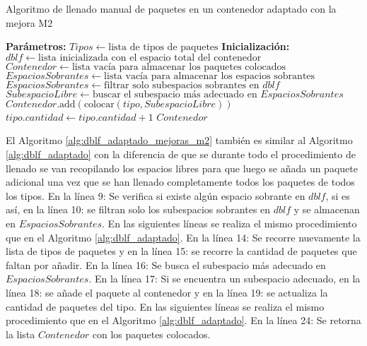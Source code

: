 \begin{algorithm}[H]
    \caption{Algoritmo de llenado manual de paquetes en un contenedor adaptado con la mejora M2}
    \label{alg:dblf_adaptado_mejoras_m2}
    \begin{algorithmic}[1]
        \State \textbf{Parámetros:} $Tipos \gets \text{lista de tipos de paquetes}$
        \State \textbf{Inicialización:} $dblf \gets \text{lista inicializada con el espacio total del contenedor}$
        \State $Contenedor \gets \text{lista vacía para almacenar los paquetes colocados}$
        \State $EspaciosSobrantes \gets \text{lista vacía para almacenar los espacios sobrantes}$
        \State {} 
        \EndFor
        \State $EspaciosSobrantes \gets \text{filtrar solo subespacios sobrantes en } dblf$
        \EndIf
        \EndFor
        \State {}
        \State $SubespacioLibre \gets \text{buscar el subespacio más adecuado en } EspaciosSobrantes$
        \State $Contenedor.\text{add}( \text{colocar}(tipo, SubespacioLibre) )$
        \State $tipo.cantidad \gets tipo.cantidad + 1$
        \EndIf
        \EndFor
        \EndFor
        \State {} 
        \State \Return $Contenedor$
    \end{algorithmic}
\end{algorithm}

El Algoritmo \ref{alg:dblf_adaptado_mejoras_m2} también es similar al Algoritmo \ref{alg:dblf_adaptado} con la diferencia de que se durante todo el procedimiento de llenado se van recopilando los espacios libres para que luego se añada un paquete adicional una vez que se han llenado completamente todos los paquetes de todos los tipos. En la línea 9: Se verifica si existe algún espacio sobrante en $dblf$, si es así, en la línea 10: se filtran solo los subespacios sobrantes en $dblf$ y se almacenan en $EspaciosSobrantes$. En las siguientes líneas se realiza el mismo procedimiento que en el Algoritmo \ref{alg:dblf_adaptado}. En la línea 14: Se recorre nuevamente la lista de tipos de paquetes y en la línea 15: se recorre la cantidad de paquetes que faltan por añadir. En la línea 16: Se busca el subespacio más adecuado en $EspaciosSobrantes$. En la línea 17: Si se encuentra un subespacio adecuado, en la línea 18: se añade el paquete al contenedor y en la línea 19: se actualiza la cantidad de paquetes del tipo. En las siguientes líneas se realiza el mismo procedimiento que en el Algoritmo \ref{alg:dblf_adaptado}. En la línea 24: Se retorna la lista $Contenedor$ con los paquetes colocados.

